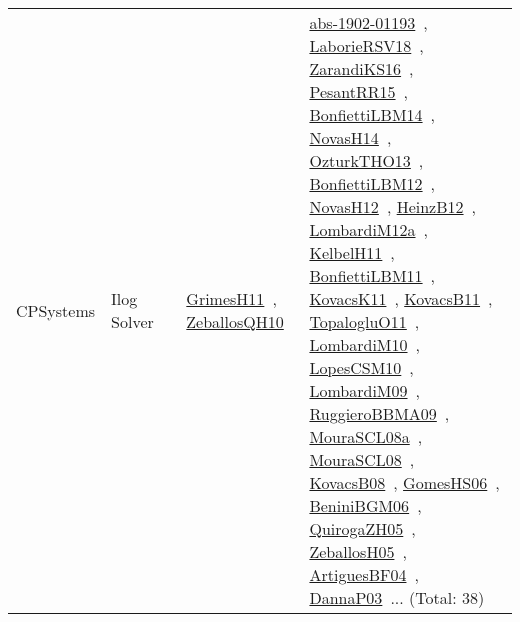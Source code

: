 {\begin{longtable}{lp{3cm}>{\raggedright\arraybackslash}p{6cm}>{\raggedright\arraybackslash}p{6cm}>{\raggedright\arraybackslash}p{8cm}}
CPSystems & Ilog Solver &  & \href{papers/GrimesH11.pdf}{GrimesH11}~\cite{GrimesH11}, \href{articles/ZeballosQH10.pdf}{ZeballosQH10}~\cite{ZeballosQH10} & \href{articles/abs-1902-01193.pdf}{abs-1902-01193}~\cite{abs-1902-01193}, \href{articles/LaborieRSV18.pdf}{LaborieRSV18}~\cite{LaborieRSV18}, \href{articles/ZarandiKS16.pdf}{ZarandiKS16}~\cite{ZarandiKS16}, \href{papers/PesantRR15.pdf}{PesantRR15}~\cite{PesantRR15}, \href{articles/BonfiettiLBM14.pdf}{BonfiettiLBM14}~\cite{BonfiettiLBM14}, \href{articles/NovasH14.pdf}{NovasH14}~\cite{NovasH14}, \href{articles/OzturkTHO13.pdf}{OzturkTHO13}~\cite{OzturkTHO13}, \href{papers/BonfiettiLBM12.pdf}{BonfiettiLBM12}~\cite{BonfiettiLBM12}, \href{articles/NovasH12.pdf}{NovasH12}~\cite{NovasH12}, \href{papers/HeinzB12.pdf}{HeinzB12}~\cite{HeinzB12}, \href{articles/LombardiM12a.pdf}{LombardiM12a}~\cite{LombardiM12a}, \href{articles/KelbelH11.pdf}{KelbelH11}~\cite{KelbelH11}, \href{papers/BonfiettiLBM11.pdf}{BonfiettiLBM11}~\cite{BonfiettiLBM11}, \href{articles/KovacsK11.pdf}{KovacsK11}~\cite{KovacsK11}, \href{articles/KovacsB11.pdf}{KovacsB11}~\cite{KovacsB11}, \href{articles/TopalogluO11.pdf}{TopalogluO11}~\cite{TopalogluO11}, \href{papers/LombardiM10.pdf}{LombardiM10}~\cite{LombardiM10}, \href{articles/LopesCSM10.pdf}{LopesCSM10}~\cite{LopesCSM10}, \href{papers/LombardiM09.pdf}{LombardiM09}~\cite{LombardiM09}, \href{articles/RuggieroBBMA09.pdf}{RuggieroBBMA09}~\cite{RuggieroBBMA09}, \href{papers/MouraSCL08a.pdf}{MouraSCL08a}~\cite{MouraSCL08a}, \href{papers/MouraSCL08.pdf}{MouraSCL08}~\cite{MouraSCL08}, \href{articles/KovacsB08.pdf}{KovacsB08}~\cite{KovacsB08}, \href{papers/GomesHS06.pdf}{GomesHS06}~\cite{GomesHS06}, \href{papers/BeniniBGM06.pdf}{BeniniBGM06}~\cite{BeniniBGM06}, \href{papers/QuirogaZH05.pdf}{QuirogaZH05}~\cite{QuirogaZH05}, \href{articles/ZeballosH05.pdf}{ZeballosH05}~\cite{ZeballosH05}, \href{papers/ArtiguesBF04.pdf}{ArtiguesBF04}~\cite{ArtiguesBF04}, \href{papers/DannaP03.pdf}{DannaP03}~\cite{DannaP03}... (Total: 38)\\

\end{longtable}}
